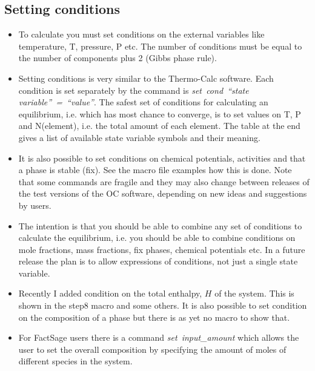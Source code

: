 \documentclass[12pt]{article}
\begin{document}
\subsection{Setting conditions}

\begin{itemize}
\item To calculate you must set conditions on the external variables
  like temperature, T, pressure, P etc.  The number of conditions must
  be equal to the number of components plus 2 (Gibbs phase rule).

\item Setting conditions is very similar to the Thermo-Calc software.
  Each condition is set separately by the command is {\em
    set~cond~``state variable''~=~``value''}.  The safest set of
  conditions for calculating an equilibrium, i.e. which has most
  chance to converge, is to set values on T, P and N(element),
  i.e. the total amount of each element.  The table at the end gives a
  list of available state variable symbols and their meaning.

\item It is also possible to set conditions on chemical potentials,
  activities and that a phase is stable (fix).  See the macro file
  examples how this is done.  Note that some commands are fragile and
  they may also change between releases of the test versions of the OC
  software, depending on new ideas and suggestions by users.

\item The intention is that you should be able to combine any set of
  conditions to calculate the equilibrium, i.e. you should be able to
  combine conditions on mole fractions, mass fractions, fix phases,
  chemical potentials etc.  In a future release the plan is to allow
  expressions of conditions, not just a single state variable.

\item Recently I added condition on the total enthalpy, $H$ of the
  system.  This is shown in the step8 macro and some others.  It is
  also possible to set condition on the composition of a phase but
  there is as yet no macro to show that.

\item For FactSage users there is a command {\em set~input\_amount}
  which allows the user to set the overall composition by specifying
  the amount of moles of different species in the system.

\end{itemize}
\end{document}
